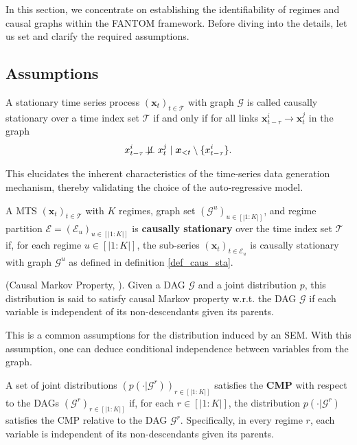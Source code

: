 In this section, we concentrate on establishing the identifiability of regimes and causal graphs within the FANTOM framework. Before diving into the details, let us set and clarify the required assumptions.
\subsection{Assumptions}
\label{app_assumptions}
 \begin{definition}
    A stationary time series process $(\boldsymbol{x}_t)_{t \in \mathcal{T}}$ with graph $\mathcal{G}$ is called causally stationary over a time index set $\mathcal{T}$ if and only if for all links $\boldsymbol{x}_{t-\tau}^i \rightarrow \boldsymbol{x}_t^j$ in the graph
\begin{equation*}
    x_{t-\tau}^i \not\!\perp\!\!\!\perp x_t^j \mid \boldsymbol{x}_{<t} \setminus \{x_{t-\tau}^i\}.
 \vspace{-10pt}   
\end{equation*}
\label{def_caus_sta}
\end{definition}
This elucidates the inherent characteristics of the time-series data generation mechanism, thereby validating the choice of the auto-regressive model.
\begin{assumption}
A MTS $(\boldsymbol{x}_t)_{t \in \mathcal{T}}$ with $K$ regimes, graph set $(\mathcal{G}^u)_{u \in [|1:K|]}$, and regime partition $\mathcal{E} = (\mathcal{E}_u)_{u \in [|1:K|]}$ is \textbf{causally stationary} over the time index set $\mathcal{T}$ if, for each regime $u \in [|1:K|]$, the sub-series $(\boldsymbol{x}_t)_{t \in \mathcal{E}_u}$ is causally stationary with graph $\mathcal{G}^u$ as defined in definition \ref{def_caus_sta}.
\label{mainass1}
\end{assumption}
\begin{definition} (Causal Markov Property, \cite{peters2017elements}). Given a DAG $\mathcal{G}$ and a joint distribution $p$, this distribution is said to satisfy causal Markov property w.r.t. the DAG $\mathcal{G}$ if each variable is independent of its non-descendants given its parents. 
\label{markovprop}
\end{definition}
This is a common assumptions for the distribution induced by an SEM. With this assumption, one
can deduce conditional independence between variables from the graph.
\begin{assumption}
A set of joint distributions $(p(\cdot|\mathcal{G}^r))_{r \in [|1:K|]}$ satisfies the \textbf{CMP} with respect to the DAGs $(\mathcal{G}^r)_{r \in [|1:K|]}$ if, for each $r \in [|1:K|]$, the distribution $p(\cdot|\mathcal{G}^r)$ satisfies the CMP relative to the DAG $\mathcal{G}^r$. Specifically, in every regime $r$, each variable is independent of its non-descendants given its parents.
\label{mainass2}
\end{assumption}
